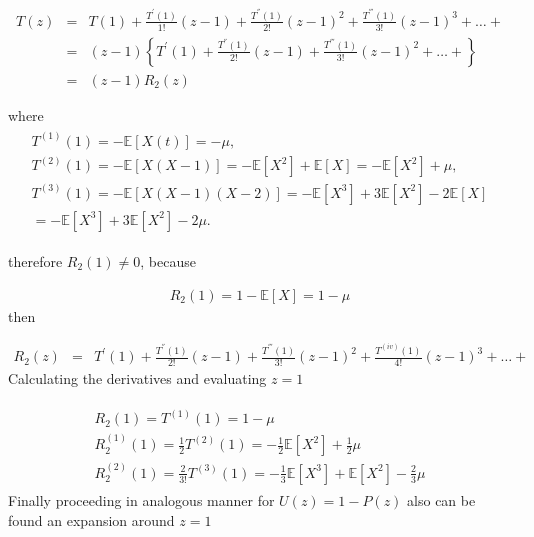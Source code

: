 \documentclass{article}
\newcommand{\esp}{\mathbb{E}}
\begin{document}
\begin{eqnarray*}
T\left(z\right)&=&T\left(1\right)+\frac{T^{'}\left(1\right)}{1!}\left(z-1\right)+\frac{T^{''}\left(1\right)}{2!}\left(z-1\right)^{2}+\frac{T^{'''}\left(1\right)}{3!}\left(z-1\right)^{3}+\ldots+\\
&=&\left(z-1\right)\left\{T^{'}\left(1\right)+\frac{T^{''}\left(1\right)}{2!}\left(z-1\right)+\frac{T^{'''}\left(1\right)}{3!}\left(z-1\right)^{2}+\ldots+\right\}\\
&=&\left(z-1\right)R_{2}\left(z\right)
\end{eqnarray*}

where
\begin{eqnarray}
\begin{array}{l}
T^{(1)}\left(1\right)=-\esp\left[X\left(t\right)\right]=-\mu,\\ T^{(2)}\left(1\right)=-\esp\left[X\left(X-1\right)\right]
=-\esp\left[X^{2}\right]+\esp\left[X\right]=-\esp\left[X^{2}\right]+\mu,\\
T^{(3)}\left(1\right)=-\esp\left[X\left(X-1\right)\left(X-2\right)\right]
=-\esp\left[X^{3}\right]+3\esp\left[X^{2}\right]-2\esp\left[X\right]\\
=-\esp\left[X^{3}\right]+3\esp\left[X^{2}\right]-2\mu.
\end{array}
\end{eqnarray}

therefore $R_{2}\left(1\right)\neq0$, because

\begin{eqnarray}\label{Eq.R2}
R_{2}\left(1\right)=1-\esp\left[X\right]=1-\mu
\end{eqnarray}
then 

\begin{eqnarray}
R_{2}\left(z\right)&=&T^{'}\left(1\right)+\frac{T^{''}\left(1\right)}{2!}\left(z-1\right)+\frac{T^{'''}\left(1\right)}{3!}\left(z-1\right)^{2}+\frac{T^{(iv)}\left(1\right)}{4!}\left(z-1\right)^{3}+\ldots+
\end{eqnarray}
Calculating the derivatives and evaluating $z=1$

\begin{eqnarray}
\begin{array}{l}
R_{2}\left(1\right)=T^{(1)}\left(1\right)=1-\mu\\
R_{2}^{(1)}\left(1\right)=\frac{1}{2}T^{(2)}\left(1\right)=-\frac{1}{2}\esp\left[X^{2}\right]+\frac{1}{2}\mu\\
R_{2}^{(2)}\left(1\right)=\frac{2}{3!}T^{(3)}\left(1\right)
=-\frac{1}{3}\esp\left[X^{3}\right]+\esp\left[X^{2}\right]-\frac{2}{3}\mu
\end{array}
\end{eqnarray}
Finally proceeding in analogous manner for $U\left(z\right)=1-P\left(z\right)$ also can be found an expansion around $z=1$
\end{document}
